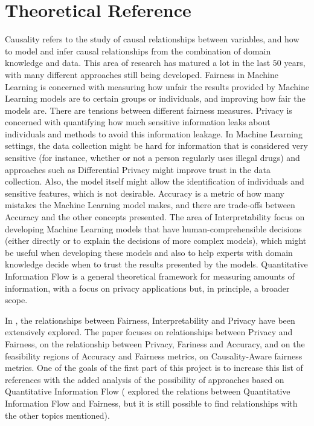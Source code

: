 \documentclass{article}
\begin{document}
\section{Theoretical Reference}

Causality refers to the study of causal relationships between variables, and how to model and infer causal relationships from the combination of domain knowledge and data\cite{Causality}. This area of research has matured a lot in the last $50$ years, with many different approaches still being developed. Fairness in Machine Learning is concerned with measuring how unfair the results provided by Machine Learning models are to certain groups or individuals\cite{FairMeasures}, and improving how fair the models are\cite{FairSolve}. There are tensions between different fairness measures\cite{Impossibility}\cite{FairTensions}. Privacy is concerned with quantifying how much sensitive information leaks about individuals and methods to avoid this information leakage. In Machine Learning settings, the data collection might be hard for information that is considered very sensitive (for instance, whether or not a person regularly uses illegal drugs) and approaches such as Differential Privacy\cite{DP} might improve trust in the data collection. Also, the model itself might allow the identification of individuals and sensitive features, which is not desirable\cite{liu2021machine}. Accuracy is a metric of how many mistakes the Machine Learning model makes, and there are trade-offs between Accuracy and the other concepts presented\cite{Sok}\cite{Carlos}\cite{Rachel}. The area of Interpretability focus on developing Machine Learning models that have human-comprehensible decisions (either directly or to explain the decisions of more complex models), which might be useful when developing these models\cite{ExplDev} and also to help experts with domain knowledge decide when to trust the results presented by the models\cite{ExplainExperts}. Quantitative Information Flow is a general theoretical framework for measuring amounts of information, with a focus on privacy applications but, in principle, a broader scope\cite{QIF}.

In \cite{Sok}, the relationships between Fairness, Interpretability and Privacy have been extensively explored. The paper \cite{Awareness} focuses on relationships between Privacy and Fairness, \cite{Rachel} on the relationship between Privacy, Fariness and Accuracy, \cite{Carlos} and \cite{Reductions} on the feasibility regions of Accuracy and Fairness metrics, \cite{CausalFair} on Causality-Aware fairness metrics. One of the goals of the first part of this project is to increase this list of references with the added analysis of the possibility of approaches based on Quantitative Information Flow (\cite{Bruno} explored the relations between Quantitative Information Flow and Fairness, but it is still possible to find relationships with the other topics mentioned).
\end{document}
